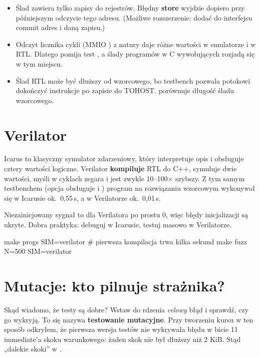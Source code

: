 \begin{itemize}
  \item Ślad zawiera tylko zapisy do rejestrów. Błędny \textbf{store} wyjdzie
    dopiero przy późniejszym odczycie tego adresu. (Możliwe rozszerzenie: dodać
    do interfejsu commit adres i daną zapisu.)
  \item Odczyt licznika cykli (MMIO ) z natury daje różne wartości w
    emulatorze i w RTL. Dlatego  pomija test , a
    ślady programów w C wywołujących  rozjadą się w tym miejscu.
  \item Ślad RTL może być dłuższy od wzorcowego, bo testbench pozwala potokowi
    dokończyć instrukcje po zapisie do TOHOST.  porównuje
    długość śladu wzorcowego.
\end{itemize}

\section{Verilator}

Icarus to klasyczny symulator zdarzeniowy, który interpretuje opis i obsługuje
cztery wartości logiczne. Verilator \textbf{kompiluje} RTL do C++, symuluje dwie
wartości, myśli w cyklach zegara i jest zwykle 10--100× szybszy. Z tym samym
testbenchem (opcja  obsługuje  i )
program  na rozwiązaniu wzorcowym wykonywał się w Icarusie
ok.\ 0,55\,s, a w Verilatorze ok.\ 0,01\,s.

\begin{pulapka}
Niezainicjowany sygnał to dla Verilatora po prostu 0, więc błędy inicjalizacji
są ukryte. Dobra praktyka: debuguj w Icarusie, testuj masowo w Verilatorze.
\end{pulapka}

\begin{sh}
make progs SIM=verilator       # pierwsza kompilacja trwa kilka sekund
make fuzz N=500 SIM=verilator
\end{sh}

\section{Mutacje: kto pilnuje strażnika?}

Skąd wiadomo, że testy są dobre? Wstaw do rdzenia \emph{celowy} błąd i sprawdź,
czy go wykryją. To się nazywa \textbf{testowanie mutacyjne}. Przy tworzeniu kursu
w ten sposób odkryłem, że pierwsza wersja testów nie wykrywała błędu w bicie 11
immediate'a skoku warunkowego: żaden skok nie był dłuższy niż 2 KiB. Stąd
„dalekie skoki” w .

